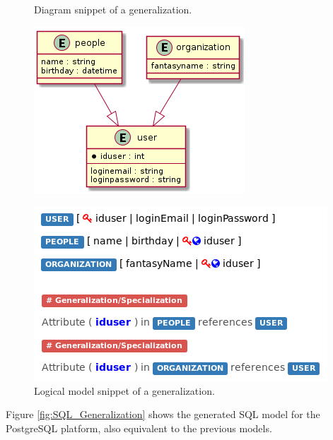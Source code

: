 \begin{figure}[!htb]
  \centering
  \begin{minipage}[b]{0.4\textwidth}
    \caption{Diagram snippet of a generalization.}
    \includegraphics[width=\textwidth]{img/Diagram_Generalization.png}
    \label{fig:Diagram_Generalization}
  \end{minipage}
  \hfill
  \begin{minipage}[b]{0.5\textwidth}
    \caption{Logical model snippet of a generalization.}
    \label{fig:Logical_Generalization}
    \includegraphics[width=\textwidth]{img/Logical_Generalization.png}
  \end{minipage}
\end{figure}

Figure \ref{fig:SQL_Generalization} shows the generated SQL model for the PostgreSQL platform, also equivalent to the previous models.

